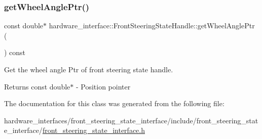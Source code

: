 \subsubsection{\texorpdfstring{get\+Wheel\+Angle\+Ptr()}{getWheelAnglePtr()}}
{\footnotesize\ttfamily const double$\ast$ hardware\+\_\+interface\+::\+Front\+Steering\+State\+Handle\+::get\+Wheel\+Angle\+Ptr (\begin{DoxyParamCaption}{ }\end{DoxyParamCaption}) const\hspace{0.3cm}{\ttfamily [inline]}}



Get the wheel angle Ptr of front steering state handle. 

\begin{DoxyReturn}{Returns}
const double$\ast$ -\/ Position pointer 
\end{DoxyReturn}


The documentation for this class was generated from the following file\+:\begin{DoxyCompactItemize}
\item 
hardware\+\_\+interfaces/front\+\_\+steering\+\_\+state\+\_\+interface/include/front\+\_\+steering\+\_\+state\+\_\+interface/\hyperlink{front__steering__state__interface_8h}{front\+\_\+steering\+\_\+state\+\_\+interface.\+h}\end{DoxyCompactItemize}
